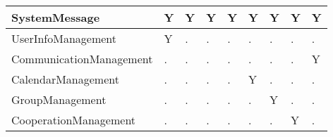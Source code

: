 \begin{table}[htbp]
\begin{tabular}{|p{9em}|p{2.5em}|p{2.5em}|p{2.5em}|p{2.5em}|p{2.5em}|
                            p{2.5em}|p{2.5em}|p{2.5em}|}
                \hline
                SystemMessage       & Y   & Y     & Y 
                                    & Y   & Y     & Y
                                    & Y   & Y     \\
                \hline
                UserInfoManagement       & Y   & .     & .
                                    & .   & .     & .
                                    & .   & .     \\
                \hline
                CommunicationManagement       & .   & .     & . 
                                    & .   & .     & .
                                    & .   & Y     \\
                \hline
                CalendarManagement       & .   & .     & .
                                    & .   & Y     & .
                                    & .   & .     \\
                \hline
                GroupManagement       & .   & .     & . 
                                    & .   & .     & Y
                                    & .   & .     \\
                \hline
                CooperationManagement       & .   & .     & . 
                                    & .   & .     & .
                                    & Y   & .     \\
                \hline
                
                
                
            \end{tabular}
        \end{table}
